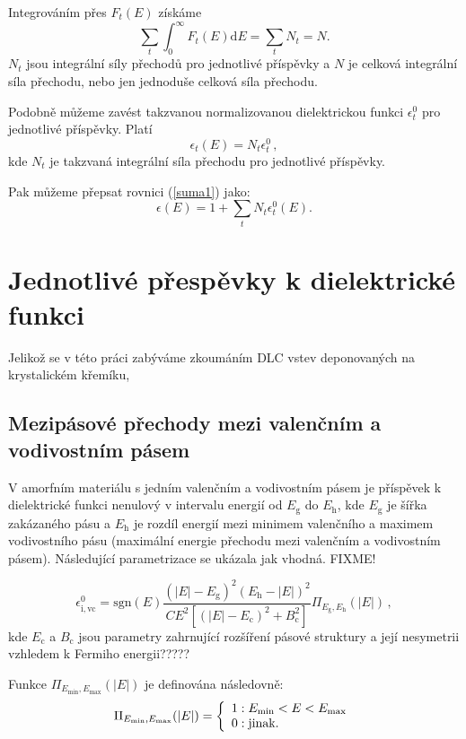 Integrováním přes $F_t(E)$ získáme 
\begin{equation}
\sum_t \int_0^\infty F_t(E)\mathrm{d}E = \sum_t N_t = N \mathrm{.}
\end{equation}
$N_t$ jsou integrální síly přechodů pro jednotlivé příspěvky a $N$ je celková integrální síla přechodu, nebo jen jednoduše celková síla přechodu.  

Podobně můžeme zavést takzvanou normalizovanou dielektrickou funkci $\epsilon_t^0$ pro jednotlivé příspěvky. Platí 
\begin{equation}
\epsilon_t(E) = N_t \epsilon_t^0  \, \mathrm{,}
\end{equation}
kde $N_t$ je takzvaná integrální síla přechodu pro jednotlivé příspěvky.

Pak můžeme přepsat rovnici (\ref{suma1}) jako:
\begin{equation}
\epsilon (E) = 1 + \sum_t N_t \epsilon_t^0(E) \mathrm{.}
\end{equation}


\section{Jednotlivé přespěvky k dielektrické funkci}
Jelikož se v této práci zabýváme zkoumáním DLC vstev deponovaných na krystalickém křemíku, 

\subsection{Mezipásové přechody mezi valenčním a vodivostním pásem}
V amorfním materiálu s jedním valenčním a vodivostním pásem je příspěvek k dielektrické funkci nenulový v intervalu energií od $E_\mathrm{g}$ do $E_\mathrm{h}$, kde $E_\mathrm{g}$ je šířka zakázaného pásu a $E_\mathrm{h}$ je rozdíl energií mezi minimem valenčního a maximem vodivostního pásu (maximální energie přechodu mezi valenčním a vodivostním pásem). Následující parametrizace se ukázala jak vhodná. FIXME!

\begin{equation}
\label{valencvod}
\epsilon_\mathrm{i,vc}^0 = \mathrm{sgn}(E) \frac{(|E|- E_\mathrm{g})^2(E_\mathrm{h} - |E|)^2}{ C E^2 [(|E| - E_\mathrm{c})^2 + B_\mathrm{c}^2]} \Pi_{E_\mathrm{g},E_\mathrm{h}}(|E|) \, \mathrm{,}
\end{equation}
kde $E_\mathrm{c}$ a $B_\mathrm{c}$ jsou parametry zahrnující rozšíření pásové struktury a její nesymetrii vzhledem k Fermiho energii?????

Funkce $\Pi_{E_\mathrm{min},E_\mathrm{max}}(|E|)$ je definována následovně:
\begin{equation}
\Pi_{E_\mathrm{min},E_\mathrm{max}}(|E|) = 
	\left\{\begin{array}{l l} 
	1 : E_\mathrm{min} < E < E_\mathrm{max} \\
	0 : \text{jinak.} \end{array} \right.
\end{equation}

